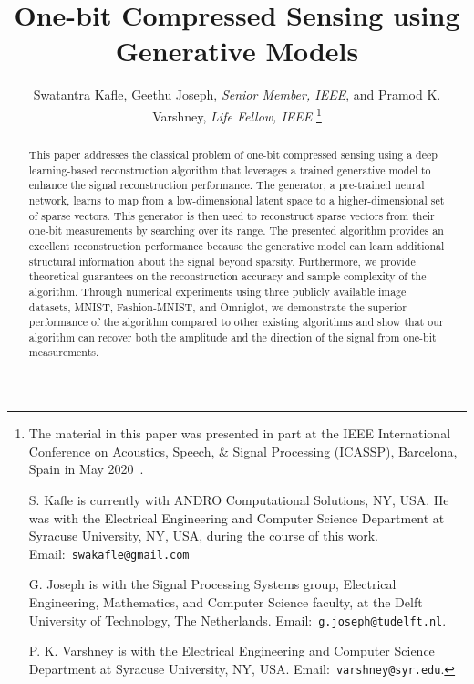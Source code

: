 \documentclass[journal]{IEEEtran}
\begin{document}
\title{One-bit Compressed Sensing using Generative Models}
\author{ 
	\author{Swatantra Kafle, Geethu Joseph, \textit{Senior Member, IEEE},  and Pramod K. Varshney, \textit{Life Fellow, IEEE}
    \thanks{The material in this paper was presented
in part at the IEEE International Conference on Acoustics, Speech, \& Signal Processing (ICASSP), Barcelona, Spain in May 2020~\cite{joseph2020one}.

S. Kafle is currently with ANDRO Computational Solutions, NY, USA. He was with the Electrical Engineering and Computer Science Department at Syracuse University,  NY, USA, during the course of this work. Email:~\texttt{swakafle@gmail.com}

G. Joseph is with the Signal Processing Systems group, Electrical Engineering, Mathematics, and Computer Science faculty, at the Delft University of Technology, The Netherlands. Email:~\texttt{g.joseph@tudelft.nl}.

P. K. Varshney is with the Electrical Engineering and Computer Science Department at Syracuse University,  NY, USA. Email:~\texttt{varshney@syr.edu}.
}


}
}

\maketitle
\begin{abstract}
This paper addresses the classical problem
of one-bit compressed sensing using a deep learning-based
reconstruction algorithm that leverages a trained generative
model to enhance the signal reconstruction performance. The
generator,  a pre-trained neural network, learns to map from
a low-dimensional latent space to a higher-dimensional set of sparse
vectors. This generator is then used to reconstruct sparse
vectors from their one-bit measurements by searching over its
range. The presented algorithm provides an excellent reconstruction performance because the generative model can learn additional structural information about the signal beyond sparsity. Furthermore, we provide theoretical guarantees on the reconstruction accuracy and sample complexity of the algorithm. Through numerical experiments using three publicly
available image datasets,  MNIST, Fashion-MNIST, and Omniglot, we demonstrate the superior performance of the algorithm compared to other existing algorithms and show that our algorithm can recover both the amplitude and the direction of the signal from one-bit measurements. 
\end{abstract}
\end{document}

